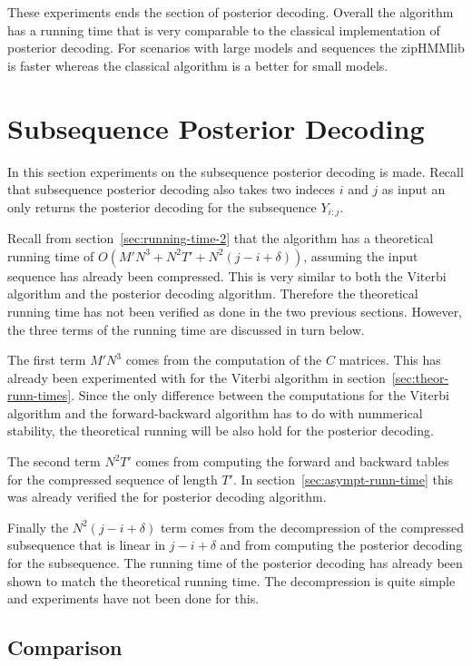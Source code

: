These experiments ends the section of posterior decoding. Overall the algorithm
has a running time that is very comparable to the classical implementation of
posterior decoding. For scenarios with large models and sequences the zipHMMlib
is faster whereas the classical algorithm is a better for small models.

\section{Subsequence Posterior Decoding}

In this section experiments on the subsequence posterior decoding is
made. Recall that subsequence posterior decoding also takes two indeces $i$ and
$j$ as input an only returns the posterior decoding for the subsequence
$Y_{i:j}$.

Recall from section~\ref{sec:running-time-2} that the algorithm has a
theoretical running time of $O(M' N^3 + N^2 T' + N^2 (j - i + \delta))$,
assuming the input sequence has already been compressed. This is very similar
to both the Viterbi algorithm and the posterior decoding algorithm. Therefore
the theoretical running time has not been verified as done in the two previous
sections. However, the three terms of the running time are discussed in turn
below.

The first term $M' N^3$ comes from the computation of the $C$ matrices. This
has already been experimented with for the Viterbi algorithm in
section~\ref{sec:theor-runn-times}. Since the only difference between the
computations for the Viterbi algorithm and the forward-backward algorithm has
to do with nummerical stability, the theoretical running will be also hold for
the posterior decoding.

The second term $N^2 T'$ comes from computing the forward and backward tables
for the compressed sequence of length $T'$. In
section~\ref{sec:asympt-runn-time} this was already verified the for posterior
decoding algorithm.

Finally the $N^2 (j - i + \delta)$ term comes from the decompression of the
compressed subsequence that is linear in $j - i + \delta$ and from computing
the posterior decoding for the subsequence. The running time of the posterior
decoding has already been shown to match the theoretical running time. The
decompression is quite simple and experiments have not been done for
this. 

\subsection{Comparison}


